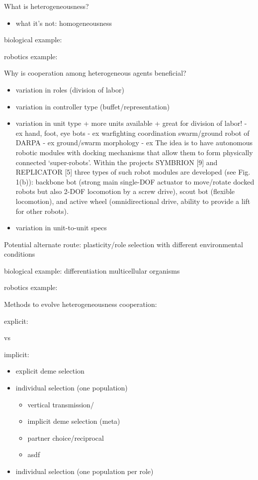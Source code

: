 What is heterogeneousness?
\begin{itemize}
\item what it's not: homogeneousness
\end{itemize}

biological example:

robotics example:


Why is cooperation among heterogeneous agents beneficial?
\begin{itemize}
\item variation in roles (division of labor)
\item variation in controller type (buffet/representation)
\item variation in unit type
+ more units available
+ great for division of labor!
  - ex hand, foot, eye bots \cite{dorigo2013novel}
  - ex warfighting coordination swarm/ground robot of DARPA
  - ex ground/swarm morphology \cite{mathews2012supervised}
  - ex The idea is to have autonomous robotic modules with docking mechanisms that allow them to form physically connected ‘super-robots’. Within the projects SYMBRION [9] and REPLICATOR [5] three types of such robot modules are developed (see Fig. 1(b)): backbone bot (strong main single-DOF actuator to move/rotate docked robots but also 2-DOF locomotion by a screw drive), scout bot (flexible locomotion), and active wheel (omnidirectional drive, ability to provide a lift for other robots).\cite{hamann2012towards}
\item variation in unit-to-unit specs \cite{pugh2007parallel} \cite{duarte2016evolution}
\end{itemize}

Potential alternate route: plasticity/role selection with different environmental conditions

biological example: differentiation multicellular organisms

robotics example:

Methods to evolve heterogeneousness cooperation:

explicit:

vs

implicit:

\begin{itemize}
\item explicit deme selection
\item individual selection (one population)
\begin{itemize}
  \item vertical transmission/
  \item implicit deme selection (meta)
  \item partner choice/reciprocal
\end{itemize}
\begin{itemize}
  \item asdf
\end{itemize}
\item individual selection (one population per role) \cite{luke1996evolving}
\end{itemize}

